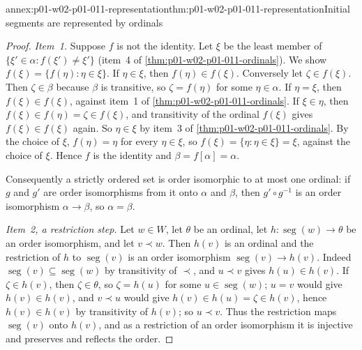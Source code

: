 \begin{annexitem}{annex:p01-w02-p01-011-representation}{thm:p01-w02-p01-011-representation}{Initial segments are represented by ordinals}
\begin{proof}
\emph{Item~1.} Suppose \(f\) is not the identity. Let \(\xi\) be the least
member of \(\{\xi'\in\alpha:f(\xi')\ne\xi'\}\) (item~4 of
\cref{thm:p01-w02-p01-011-ordinals}). We show
\(f(\xi)=\{f(\eta):\eta\in\xi\}\). If \(\eta\in\xi\), then
\(f(\eta)\in f(\xi)\). Conversely let \(\zeta\in f(\xi)\). Then
\(\zeta\in\beta\) because \(\beta\) is transitive, so \(\zeta=f(\eta)\) for
some \(\eta\in\alpha\). If \(\eta=\xi\), then \(f(\xi)\in f(\xi)\), against
item~1 of \cref{thm:p01-w02-p01-011-ordinals}. If \(\xi\in\eta\), then
\(f(\xi)\in f(\eta)=\zeta\in f(\xi)\), and transitivity of the ordinal
\(f(\xi)\) gives \(f(\xi)\in f(\xi)\) again. So \(\eta\in\xi\) by item~3 of
\cref{thm:p01-w02-p01-011-ordinals}. By the choice of \(\xi\),
\(f(\eta)=\eta\) for every \(\eta\in\xi\), so
\(f(\xi)=\{\eta:\eta\in\xi\}=\xi\), against the choice of \(\xi\). Hence
\(f\) is the identity and \(\beta=f[\alpha]=\alpha\).

Consequently a strictly ordered set is order isomorphic to at most one
ordinal: if \(g\) and \(g'\) are order isomorphisms from it onto \(\alpha\)
and \(\beta\), then \(g'\circ g^{-1}\) is an order isomorphism
\(\alpha\to\beta\), so \(\alpha=\beta\).

\emph{Item~2, a restriction step.} Let \(w\in W\), let \(\theta\) be an
ordinal, let \(h:\operatorname{seg}(w)\to\theta\) be an order isomorphism,
and let \(v\prec w\). Then \(h(v)\) is an ordinal and the restriction of
\(h\) to \(\operatorname{seg}(v)\) is an order isomorphism
\(\operatorname{seg}(v)\to h(v)\). Indeed
\(\operatorname{seg}(v)\subseteq\operatorname{seg}(w)\) by transitivity of
\(\prec\), and \(u\prec v\) gives \(h(u)\in h(v)\). If \(\zeta\in h(v)\),
then \(\zeta\in\theta\), so \(\zeta=h(u)\) for some
\(u\in\operatorname{seg}(w)\); \(u=v\) would give \(h(v)\in h(v)\), and
\(v\prec u\) would give \(h(v)\in h(u)=\zeta\in h(v)\), hence
\(h(v)\in h(v)\) by transitivity of \(h(v)\); so \(u\prec v\). Thus the
restriction maps \(\operatorname{seg}(v)\) onto \(h(v)\), and as a
restriction of an order isomorphism it is injective and preserves and
reflects the order.


\end{proof}
\end{annexitem}
